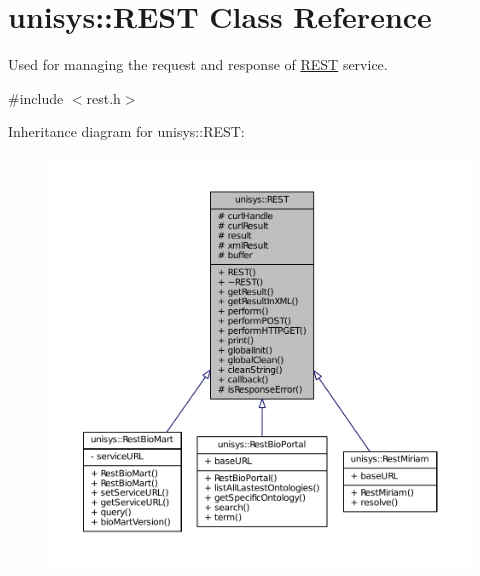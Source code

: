 \hypertarget{classunisys_1_1REST}{\section{unisys\-:\-:R\-E\-S\-T Class Reference}
\label{classunisys_1_1REST}
}


Used for managing the request and response of \hyperlink{classunisys_1_1REST}{R\-E\-S\-T} service.  




{\ttfamily \#include $<$rest.\-h$>$}



Inheritance diagram for unisys\-:\-:R\-E\-S\-T\-:
\nopagebreak
\begin{figure}[H]
\begin{center}
\leavevmode
\includegraphics[width=350pt]{classunisys_1_1REST__inherit__graph}
\end{center}
\end{figure}


